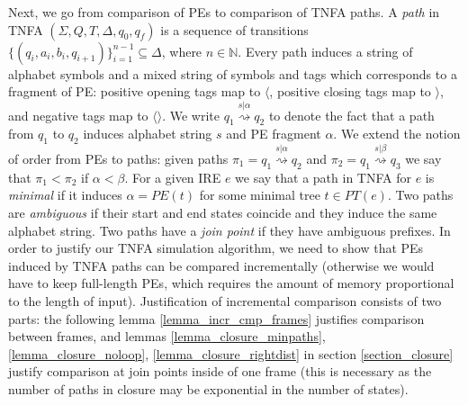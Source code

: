 \documentclass[AMA,STIX1COL]{WileyNJD-v2}
\newcommand{\Xl}{\langle}
\newcommand{\Xr}{\rangle}
\newcommand{\Xm}{\langle\!\rangle}
\newcommand{\YN}{\mathbb{N}}
\newcommand{\PT}{PT}
\newcommand{\PE}{P\!E}
\begin{document}
Next, we go from comparison of PEs to comparison of TNFA paths.
%
A \emph{path} in TNFA $(\Sigma, Q, T, \Delta, q_0, q_f)$
is a sequence of transitions $\{(q_i, a_i, b_i, q_{i + 1})\}_{i=1}^{n-1} \subseteq \Delta$, where $n \in \YN$.
%
Every path induces a string of alphabet symbols
and a mixed string of symbols and tags which corresponds to a fragment of PE:
positive opening tags map to $\Xl$,
positive closing tags map to $\Xr$,
and negative tags map to $\Xm$.
We write $q_1 \overset {s|\alpha} {\rightsquigarrow} q_2$
to denote the fact that a path from $q_1$ to $q_2$ induces alphabet string $s$ and PE fragment $\alpha$.
%
We extend the notion of order from PEs to paths: given paths
$\pi_1 = q_1 \overset {s|\alpha} {\rightsquigarrow} q_2$ and
$\pi_2 = q_1 \overset {s|\beta} {\rightsquigarrow} q_3$
we say that $\pi_1 < \pi_2$ if $\alpha < \beta$.
%
For a given IRE $e$ we say that a path in TNFA for $e$ is \emph{minimal} if it induces
$\alpha = \PE(t)$ for some minimal tree $t \in \PT(e)$.
%
Two paths are \emph{ambiguous} if their start and end states coincide and they induce the same alphabet string.
Two paths have a \emph{join point} if they have ambiguous prefixes.
%
In order to justify our TNFA simulation algorithm,
we need to show that PEs induced by TNFA paths can be compared incrementally
(otherwise we would have to keep full-length PEs, which requires the amount of memory proportional to the length of input).
Justification of incremental comparison consists of two parts:
the following lemma \ref{lemma_incr_cmp_frames} justifies comparison between frames,
and lemmas \ref{lemma_closure_minpaths}, \ref{lemma_closure_noloop}, \ref{lemma_closure_rightdist}
in section \ref{section_closure} justify comparison at join points inside of one frame
(this is necessary as the number of paths in closure may be exponential in the number of states).
\end{document}
